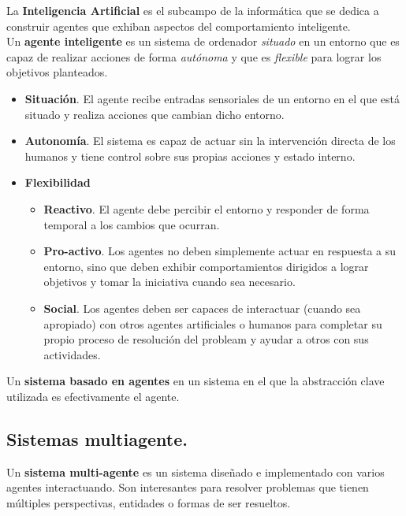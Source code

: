 \documentclass[12pt,spanish]{article}
\numberwithin{definition}{subsection}
\begin{document}
La \textbf{Inteligencia Artificial} es el subcampo de la informática que se dedica a construir agentes que exhiban aspectos del comportamiento inteligente. \\

Un \textbf{agente inteligente} es un sistema de ordenador \emph{situado} en un entorno que es capaz de realizar acciones de forma \emph{autónoma} y que es \emph{flexible} para lograr los objetivos planteados.\\

\begin{itemize}
	\item \textbf{Situación}. El agente recibe entradas sensoriales de un entorno en el que está situado y realiza acciones que cambian dicho entorno.
	\item \textbf{Autonomía}. El sistema es capaz de actuar sin la intervención directa de los humanos y tiene control sobre sus propias acciones y estado interno.
	\item \textbf{Flexibilidad}
		\begin{itemize}
			\item \textbf{Reactivo}. El agente debe percibir el entorno y responder de forma temporal a los cambios que ocurran.
			\item \textbf{Pro-activo}. Los agentes no deben simplemente actuar en respuesta a su entorno, sino que deben exhibir comportamientos dirigidos a lograr objetivos y tomar la iniciativa cuando sea necesario.
			\item \textbf{Social}. Los agentes deben ser capaces de interactuar (cuando sea apropiado) con otros agentes artificiales o humanos para completar su propio proceso de resolución del probleam y ayudar a otros con sus actividades.
		\end{itemize}
\end{itemize}

Un \textbf{sistema basado en agentes} en un sistema en el que la abstracción clave utilizada es efectivamente el agente.

\subsection{Sistemas multiagente.}

Un \textbf{sistema multi-agente} es un sistema diseñado e implementado con varios agentes interactuando. Son interesantes para resolver problemas que tienen múltiples perspectivas, entidades o formas de ser resueltos.\\
\end{document}
